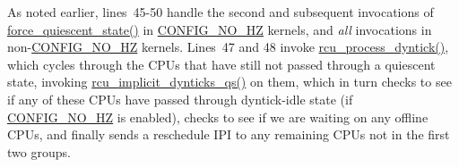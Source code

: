 As noted earlier, lines~45-50 handle the second and subsequent invocations
of \url{force_quiescent_state()} in \url{CONFIG_NO_HZ} kernels, and \emph{all}
invocations in non-\url{CONFIG_NO_HZ} kernels.
Lines~47 and 48 invoke \url{rcu_process_dyntick()}, which cycles through
the CPUs that have still not passed through a quiescent state, invoking
\url{rcu_implicit_dynticks_qs()} on them, which in turn checks to see
if any of these CPUs have passed through dyntick-idle state (if
\url{CONFIG_NO_HZ} is enabled), checks to see if we are waiting on
any offline CPUs, and finally sends a reschedule IPI to any remaining
CPUs not in the first two groups.

